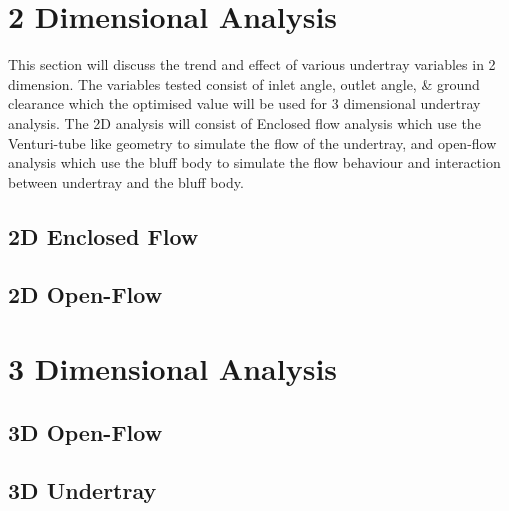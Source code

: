 \newpage
\section{2 Dimensional Analysis}
This section will discuss the trend and effect of various undertray variables in 2 dimension. The variables tested consist of inlet angle, outlet angle, \& ground clearance which the optimised value will be used for 3 dimensional undertray analysis. The 2D analysis will consist of Enclosed flow analysis which use the Venturi-tube like geometry to simulate the flow of the undertray, and open-flow analysis which use the bluff body to simulate the flow behaviour and interaction between undertray and the bluff body. 


\subsection{2D Enclosed Flow}
\subsection{2D Open-Flow}

\section{3 Dimensional Analysis}

\subsection{3D Open-Flow}
\subsection{3D Undertray}